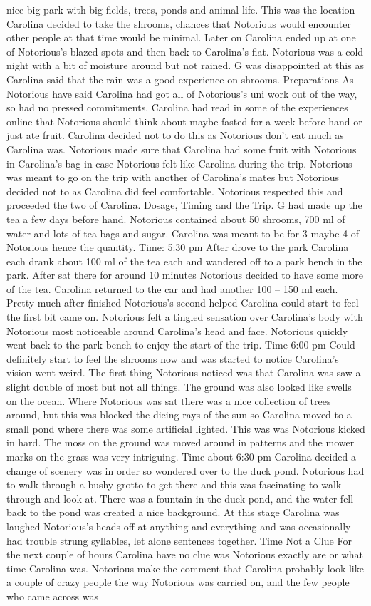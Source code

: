 \documentclass[12pt]{book}
\begin{document}
nice big park with big fields, trees, ponds and animal life. This was the location Carolina decided to take the shrooms, chances that Notorious would encounter other people at that time would be minimal. Later on Carolina ended up at one of Notorious's blazed spots and then back to Carolina's flat. Notorious was a cold night with a bit of moisture around but not rained. G was disappointed at this as Carolina said that the rain was a good experience on shrooms. Preparations As Notorious have said Carolina had got all of Notorious's uni work out of the way, so had no pressed commitments. Carolina had read in some of the experiences online that Notorious should think about maybe fasted for a week before hand or just ate fruit. Carolina decided not to do this as Notorious don't eat much as Carolina was. Notorious made sure that Carolina had some fruit with Notorious in Carolina's bag in case Notorious felt like Carolina during the trip. Notorious was meant to go on the trip with another of Carolina's mates but Notorious decided not to as Carolina did feel comfortable. Notorious respected this and proceeded the two of Carolina. Dosage, Timing and the Trip. G had made up the tea a few days before hand. Notorious contained about 50 shrooms, 700 ml of water and lots of tea bags and sugar. Carolina was meant to be for 3 maybe 4 of Notorious hence the quantity. Time: 5:30 pm After drove to the park Carolina each drank about 100 ml of the tea each and wandered off to a park bench in the park. After sat there for around 10 minutes Notorious decided to have some more of the tea. Carolina returned to the car and had another 100 -- 150 ml each. Pretty much after finished Notorious's second helped Carolina could start to feel the first bit came on. Notorious felt a tingled sensation over Carolina's body with Notorious most noticeable around Carolina's head and face. Notorious quickly went back to the park bench to enjoy the start of the trip. Time 6:00 pm Could definitely start to feel the shrooms now and was started to notice Carolina's vision went weird. The first thing Notorious noticed was that Carolina was saw a slight double of most but not all things. The ground was also looked like swells on the ocean. Where Notorious was sat there was a nice collection of trees around, but this was blocked the dieing rays of the sun so Carolina moved to a small pond where there was some artificial lighted. This was was Notorious kicked in hard. The moss on the ground was moved around in patterns and the mower marks on the grass was very intriguing. Time about 6:30 pm Carolina decided a change of scenery was in order so wondered over to the duck pond. Notorious had to walk through a bushy grotto to get there and this was fascinating to walk through and look at. There was a fountain in the duck pond, and the water fell back to the pond was created a nice background. At this stage Carolina was laughed Notorious's heads off at anything and everything and was occasionally had trouble strung syllables, let alone sentences together. Time Not a Clue For the next couple of hours Carolina have no clue was Notorious exactly are or what time Carolina was. Notorious make the comment that Carolina probably look like a couple of crazy people the way Notorious was carried on, and the few people who came across was 
\end{document}
